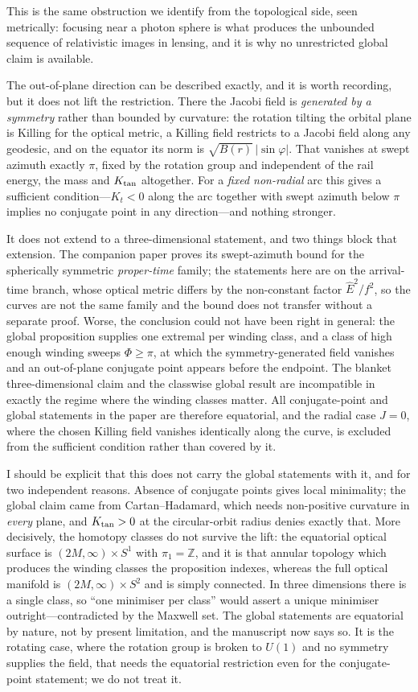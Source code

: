 \documentclass[11pt]{article}
\begin{document}
This is the same obstruction we identify from the topological side, seen
metrically: focusing near a photon sphere is what produces the unbounded sequence
of relativistic images in lensing, and it is why no unrestricted global claim is
available.

The out-of-plane direction can be described exactly, and it is worth recording,
but it does not lift the restriction. There the Jacobi field is \emph{generated
by a symmetry} rather than bounded by curvature: the rotation tilting the orbital
plane is Killing for the optical metric, a Killing field restricts to a Jacobi
field along any geodesic, and on the equator its norm is
$\sqrt{B(r)}\,|\sin\varphi|$. That vanishes at swept azimuth exactly $\pi$, fixed
by the rotation group and independent of the rail energy, the mass and
$K_{\rm tan}$ altogether. For a \emph{fixed non-radial} arc this gives a sufficient
condition---$K_t<0$ along the arc together with swept azimuth below $\pi$ implies no
conjugate point in any direction---and nothing stronger.

It does not extend to a three-dimensional statement, and two things block that
extension. The companion paper proves its swept-azimuth bound for the spherically symmetric
\emph{proper-time} family; the statements here are on the arrival-time branch,
whose optical metric differs by the non-constant factor $\hat E^2/f^2$, so the
curves are not the same family and the bound does not transfer without a separate
proof. Worse, the conclusion could not have been right in general: the global
proposition supplies one extremal per winding class, and a class of high enough
winding sweeps $\Phi\ge\pi$, at which the symmetry-generated field vanishes and an
out-of-plane conjugate point appears before the endpoint. The blanket
three-dimensional claim and the classwise global result are incompatible in exactly
the regime where the winding classes matter. All conjugate-point and global
statements in the paper are therefore equatorial, and the radial case $J=0$, where
the chosen Killing field vanishes identically along the curve, is excluded from the
sufficient condition rather than covered by it.

I should be explicit that this does not carry the global statements with it, and
for two independent reasons. Absence of conjugate points gives local minimality;
the global claim came from Cartan--Hadamard, which needs non-positive curvature in
\emph{every} plane, and $K_{\rm tan}>0$ at the circular-orbit radius denies exactly
that. More decisively, the homotopy classes do not survive the lift: the equatorial
optical surface is $(2M,\infty)\times S^1$ with $\pi_1=\mathbb{Z}$, and it is that
annular topology which produces the winding classes the proposition indexes,
whereas the full optical manifold is $(2M,\infty)\times S^2$ and is simply
connected. In three dimensions there is a single class, so ``one minimiser per
class'' would assert a unique minimiser outright---contradicted by the Maxwell set.
The global statements are equatorial by nature, not by present limitation, and the
manuscript now says so. It is the rotating case, where the rotation group is broken
to $U(1)$ and no symmetry supplies the field, that needs the equatorial restriction
even for the conjugate-point statement; we do not treat it.
\end{document}
